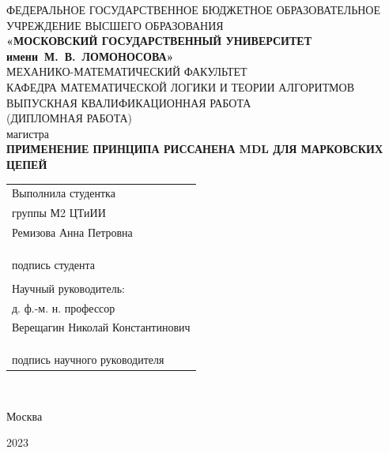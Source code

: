 \documentclass[12pt]{article}
\begin{document}
	
	\begin{center}
		\hfill \break
		\footnotesize{ФЕДЕРАЛЬНОЕ ГОСУДАРСТВЕННОЕ БЮДЖЕТНОЕ ОБРАЗОВАТЕЛЬНОЕ}\\ 
		\footnotesize{УЧРЕЖДЕНИЕ ВЫСШЕГО ОБРАЗОВАНИЯ}\\
		\small{\textbf{«МОСКОВСКИЙ ГОСУДАРСТВЕННЫЙ УНИВЕРСИТЕТ имени~М.~В.~ЛОМОНОСОВА»}}\\
		\hfill \break
		\normalsize{МЕХАНИКО-МАТЕМАТИЧЕСКИЙ ФАКУЛЬТЕТ}\\
		\hfill \break
		\normalsize{КАФЕДРА МАТЕМАТИЧЕСКОЙ ЛОГИКИ И ТЕОРИИ АЛГОРИТМОВ}\\
		\hfill\break
		\hfill \break
		\hfill \break
		\hfill \break
		\normalsize{ВЫПУСКНАЯ КВАЛИФИКАЦИОННАЯ РАБОТА\\
			(ДИПЛОМНАЯ РАБОТА)\\
			магистра}\\
		\hfill \break
		\hfill \break
		\large{\textbf{ПРИМЕНЕНИЕ ПРИНЦИПА РИССАНЕНА MDL ДЛЯ МАРКОВСКИХ ЦЕПЕЙ}}\\
		\hfill \break
		\hfill \break
		\hfill \break
	\end{center}
	
	\begin{flushright}
	\normalsize{ 
		\begin{tabular}{l}
			Выполнила студентка\\
			группы М2 ЦТиИИ\\
			Ремизова Анна Петровна\\
			\\
			\\
			\underline{\hspace{3cm}}\\
			подпись студента\\
			\\
			Научный руководитель:\\
			д. ф.-м. н. профессор\\
			Верещагин Николай Константинович\\
			\\
			\\
			\underline{\hspace{3cm}}\\
			подпись научного руководителя\\
		\end{tabular}
	}\\
	\end{flushright}
	\hfill \break
	\hfill \break
	\begin{center} Москва \end{center}
	\begin{center} 2023 \end{center}
	\thispagestyle{empty} %
	
\end{document}
